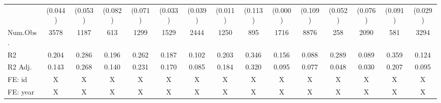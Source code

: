 \begin{table}
\begin{tabular}[t]{lcccccccccccccc}
\hspace{1em} & (0.044) & (0.053) & (0.082) & (0.071) & (0.033) & (0.039) & (0.011) & (0.113) & (0.000) & (0.109) & (0.052) & (0.076) & (0.091) & (0.029)\\
\hspace{1em}Num.Obs. & 3578 & 1187 & 613 & 1299 & 1529 & 2444 & 1250 & 895 & 1716 & 8876 & 258 & 2090 & 581 & 3294\\
\hspace{1em}R2 & 0.204 & 0.286 & 0.196 & 0.262 & 0.187 & 0.102 & 0.203 & 0.346 & 0.156 & 0.088 & 0.289 & 0.089 & 0.359 & 0.124\\
\hspace{1em}R2 Adj. & 0.143 & 0.268 & 0.140 & 0.231 & 0.170 & 0.085 & 0.184 & 0.320 & 0.095 & 0.077 & 0.048 & 0.030 & 0.207 & 0.095\\
\hspace{1em}FE: id & X & X & X & X & X & X & X & X & X & X & X & X & X & X\\
\hspace{1em}FE: year & X & X & X & X & X & X & X & X & X & X & X & X & X & X\\
\bottomrule
\end{tabular}
\end{table}